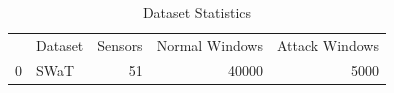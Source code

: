 \begin{table}
\caption{Dataset Statistics}
\label{tab:dataset_stats}
\begin{tabular}{llrrr}
 & Dataset & Sensors & Normal Windows & Attack Windows \\
0 & SWaT & 51 & 40000 & 5000 \\
\end{tabular}
\end{table}
